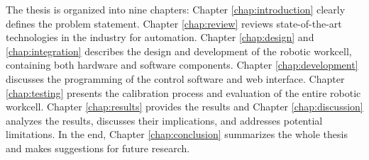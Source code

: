 The thesis is organized into nine chapters: Chapter \ref{chap:introduction} clearly defines the 
problem statement. Chapter \ref{chap:review} reviews state-of-the-art technologies in the
industry for automation. Chapter \ref{chap:design} and \ref{chap:integration} describes the design and development
of the robotic workcell, containing both hardware and software components.
Chapter \ref{chap:development} discusses the 
programming of the control software and web interface. Chapter \ref{chap:testing} 
presents the calibration process and evaluation of the entire
robotic workcell. Chapter \ref{chap:results} provides the results and Chapter \ref{chap:discussion} analyzes the results, discusses 
their implications, and addresses potential limitations. In the end, Chapter \ref{chap:conclusion}
summarizes the whole thesis and makes suggestions for
future research.